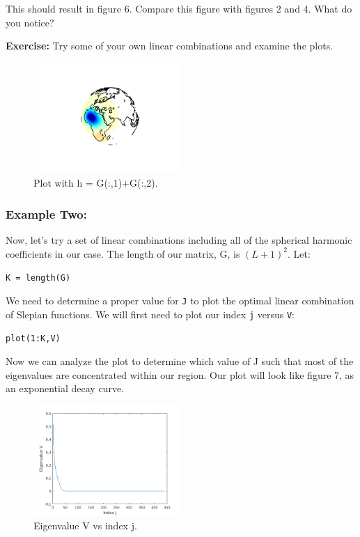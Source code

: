 \documentclass[11pt]{article}
\begin{document}
This should result in figure 6.  Compare this figure with figures 2 and 4.  What do you notice?

\textbf{Exercise:} Try some of your own linear combinations and examine the plots.

\begin{figure}[H]
  \centering
  \includegraphics[width=0.5\textwidth]{figures/hcombml.png}
  \caption{Plot with h = G(:,1)+G(:,2).}
\label{lincomb}
\end{figure}


\subsubsection{Example Two:}
Now, let's try a set of linear combinations including all of the spherical harmonic coefficients in our case.  The length of our matrix, G, is $(L+1)^2$.  Let:

\verb|K = length(G)|

We need to determine a proper value for \verb+J+ to plot the optimal linear combination of Slepian functions.  We will first need to plot our index \verb+j+ versus \verb+V+:

\verb|plot(1:K,V)|

Now we can analyze the plot to determine which value of J such that most of the eigenvalues are concentrated within our region.  Our plot will look like figure 7, as an exponential decay curve.  

\begin{figure}[H]
  \centering
  \includegraphics[width=0.5\textwidth]{figures/Vvsj_ml.png}
  \caption{Eigenvalue V vs index j.}
\label{eigenvalue}
\end{figure}
\end{document}
